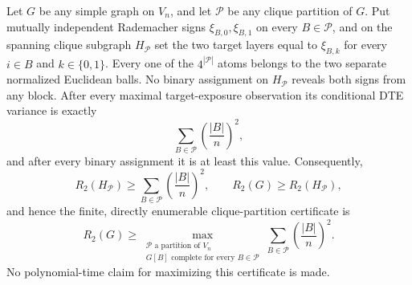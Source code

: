 Let \(G\) be any simple graph on \(V_n\), and let \(\mathcal P\) be any clique partition of \(G\). Put mutually independent Rademacher signs \(\xi_{B,0},\xi_{B,1}\) on every \(B\in\mathcal P\), and on the spanning clique subgraph \(H_{\mathcal P}\) set the two target layers equal to \(\xi_{B,k}\) for every \(i\in B\) and \(k\in\{0,1\}\). Every one of the \(4^{|\mathcal P|}\) atoms belongs to the two separate normalized Euclidean balls. No binary assignment on \(H_{\mathcal P}\) reveals both signs from any block. After every maximal target-exposure observation its conditional DTE variance is exactly
\[
\sum_{B\in\mathcal P}\left(\frac{|B|}{n}\right)^2,
\]
and after every binary assignment it is at least this value. Consequently,
\[
R_2(H_{\mathcal P})\geq
\sum_{B\in\mathcal P}\left(\frac{|B|}{n}\right)^2,
\qquad
R_2(G)\geq R_2(H_{\mathcal P}),
\]
and hence the finite, directly enumerable clique-partition certificate is
\[
R_2(G)\geq
\max_{\substack{\mathcal P\text{ a partition of }V_n\\
G[B]\text{ complete for every }B\in\mathcal P}}
\sum_{B\in\mathcal P}\left(\frac{|B|}{n}\right)^2.
\]
No polynomial-time claim for maximizing this certificate is made.
